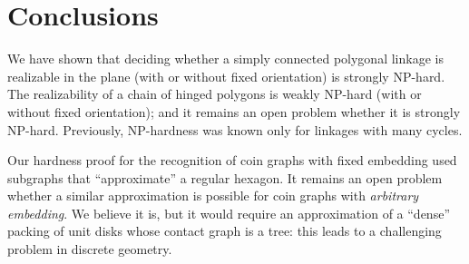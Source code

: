 \documentclass[runningheads]{article}
\newcommand{\PP}{{\cal P}} %
\begin{document}
%
%

\section{Conclusions \label{sec:con}}

We have shown that deciding whether a simply connected polygonal linkage is realizable in the plane (with or without fixed orientation) is strongly NP-hard. The realizability of a chain of hinged polygons is weakly NP-hard (with or without fixed orientation); and it remains an open problem whether it is strongly NP-hard. Previously, NP-hardness was known only for linkages with many cycles.

Our hardness proof for the recognition of coin graphs with fixed embedding used subgraphs that ``approximate'' a regular hexagon. It remains an open problem whether a similar approximation is possible for coin graphs with \emph{arbitrary embedding}. We believe it is, but it would require an approximation of a ``dense'' packing of unit disks whose contact graph is a tree: this leads to a challenging problem in discrete geometry.
\end{document}
